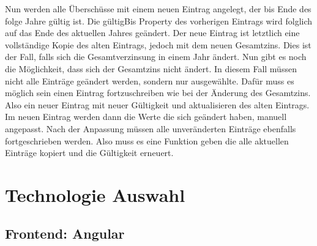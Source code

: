 Nun werden alle Überschüsse mit einem neuen Eintrag angelegt, der bis Ende des folge Jahre gültig ist. Die gültigBis Property des vorherigen Eintrags wird folglich auf das Ende des aktuellen Jahres geändert.
Der neue Eintrag ist letztlich eine vollständige Kopie des alten Eintrags, jedoch mit dem neuen Gesamtzins. Dies ist der Fall, falls sich die Gesamtverzinsung in einem Jahr ändert.
Nun gibt es noch die Möglichkeit, dass sich der Gesamtzins nicht ändert. In diesem Fall müssen nicht alle Einträge geändert werden, sondern nur ausgewählte. 
Dafür muss es möglich sein einen Eintrag fortzuschreiben wie bei der Änderung des Gesamtzins. Also ein neuer Eintrag mit neuer Gültigkeit und aktualisieren des alten Eintrags.
Im neuen Eintrag werden dann die Werte die sich geändert haben, manuell angepasst. Nach der Anpassung müssen alle unveränderten Einträge ebenfalls fortgeschrieben werden. 
Also muss es eine Funktion geben die alle aktuellen Einträge kopiert und die Gültigkeit erneuert.


\section{Technologie Auswahl}
\subsection{Frontend: Angular}
